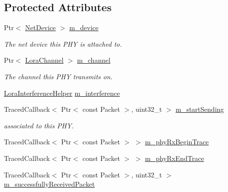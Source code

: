\subsection*{Protected Attributes}
\begin{DoxyCompactItemize}
\item 
\mbox{\label{classns3_1_1lorawan_1_1LoraPhy_acc016e0822a6eb4e302808a67d9d08ca}} 
Ptr$<$ \hyperlink{classNetDevice}{Net\+Device} $>$ \hyperlink{classns3_1_1lorawan_1_1LoraPhy_acc016e0822a6eb4e302808a67d9d08ca}{m\+\_\+device}
\begin{DoxyCompactList}\small\item\em The net device this P\+HY is attached to. \end{DoxyCompactList}\item 
\mbox{\label{classns3_1_1lorawan_1_1LoraPhy_af9ad1e12693171fcb252440b7f4caa78}} 
Ptr$<$ \hyperlink{classns3_1_1lorawan_1_1LoraChannel}{Lora\+Channel} $>$ \hyperlink{classns3_1_1lorawan_1_1LoraPhy_af9ad1e12693171fcb252440b7f4caa78}{m\+\_\+channel}
\begin{DoxyCompactList}\small\item\em The channel this P\+HY transmits on. \end{DoxyCompactList}\item 
\hyperlink{classns3_1_1lorawan_1_1LoraInterferenceHelper}{Lora\+Interference\+Helper} \hyperlink{classns3_1_1lorawan_1_1LoraPhy_a1d262de59f3cc274e5506386ad5ab2fc}{m\+\_\+interference}
\item 
Traced\+Callback$<$ Ptr$<$ const Packet $>$, uint32\+\_\+t $>$ \hyperlink{classns3_1_1lorawan_1_1LoraPhy_a7b9de28c406d2f27a73c4b98c810213c}{m\+\_\+start\+Sending}
\begin{DoxyCompactList}\small\item\em associated to this P\+HY. \end{DoxyCompactList}\item 
Traced\+Callback$<$ Ptr$<$ const Packet $>$ $>$ \hyperlink{classns3_1_1lorawan_1_1LoraPhy_acf6240e545a2646a4af53760f8b8895b}{m\+\_\+phy\+Rx\+Begin\+Trace}
\item 
Traced\+Callback$<$ Ptr$<$ const Packet $>$ $>$ \hyperlink{classns3_1_1lorawan_1_1LoraPhy_a1ce0b29764e69e51ee7c723cdb28d8a5}{m\+\_\+phy\+Rx\+End\+Trace}
\item 
Traced\+Callback$<$ Ptr$<$ const Packet $>$, uint32\+\_\+t $>$ \hyperlink{classns3_1_1lorawan_1_1LoraPhy_a78b4d352f67b17df0e720ef276a86fea}{m\+\_\+successfully\+Received\+Packet}

\end{DoxyCompactItemize}
